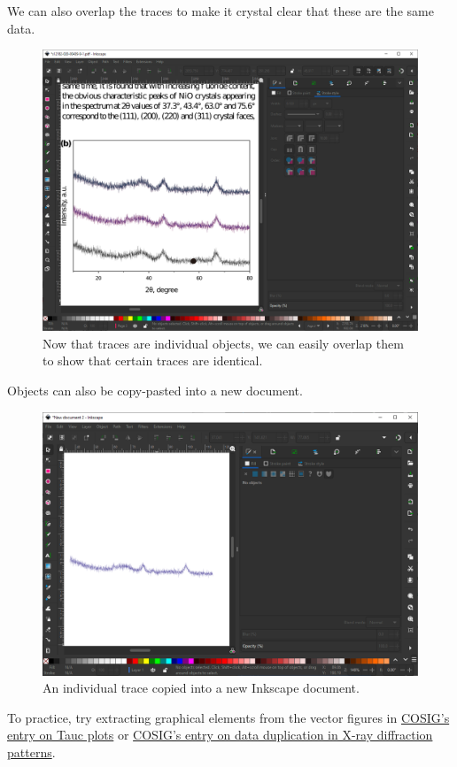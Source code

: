 \documentclass[letterpaper, 12pt]{article}
\begin{document}
\pagebreak
We can also overlap the traces to make it crystal clear that these are the same data.

\begin{figure}[h!tbp]
    \includegraphics[width=\textwidth]{img/vector/in_inkscape_individual_traces_thinned_overlapping.PNG}
    \caption*{Now that traces are individual objects, we can easily overlap them to show that certain traces are identical.}
\end{figure}

\pagebreak
Objects can also be copy-pasted into a new document.

\begin{figure}[h!tbp]
    \includegraphics[width=\textwidth]{img/vector/inkscape_new_document.PNG}
    \caption*{ An individual trace copied into a new Inkscape document.}
\end{figure}

To practice, try extracting graphical elements from the vector figures in \href{https://osf.io/gpxvf}{COSIG's entry on Tauc plots} or \href{https://osf.io/685xa}{COSIG's entry on data duplication in X-ray diffraction patterns}.
\end{document}
